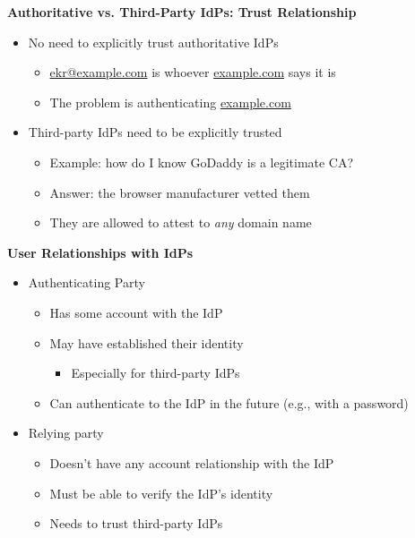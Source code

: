 \documentclass[helvetica]{seminar}
\newcommand{\heading}[1]{%
  \begin{center} 
    \large\bf 
    #1 
  \end{center} 
  \vspace{.4 in}}
\begin{document}
\begin{slide}
\heading{Authoritative vs. Third-Party IdPs: Trust Relationship}

\begin{itemize}
\item No need to explicitly trust authoritative IdPs
  \begin{itemize}
  \item \url{ekr@example.com} is whoever \url{example.com} says it is
  \item The problem is authenticating \url{example.com}
  \end{itemize}

\item Third-party IdPs need to be explicitly trusted
  \begin{itemize}
  \item Example: how do I know GoDaddy is a legitimate CA?
  \item Answer: the browser manufacturer vetted them
  \item They are allowed to attest to \emph{any} domain name
  \end{itemize}
\end{itemize}
\end{slide}


\begin{slide}
\heading{User Relationships with IdPs}

\begin{itemize}
\item Authenticating Party
  \begin{itemize}
  \item Has some account with the IdP
  \item May have established their identity 
    \begin{itemize}
    \item Especially for third-party IdPs
    \end{itemize}
  \item Can authenticate to the IdP in the future (e.g., with a password)
  \end{itemize}

\item Relying party
  \begin{itemize}
  \item Doesn't have any account relationship with the IdP
  \item Must be able to verify the IdP's identity
  \item Needs to trust third-party IdPs
  \end{itemize}

\end{itemize}
\end{slide}
\end{document}
